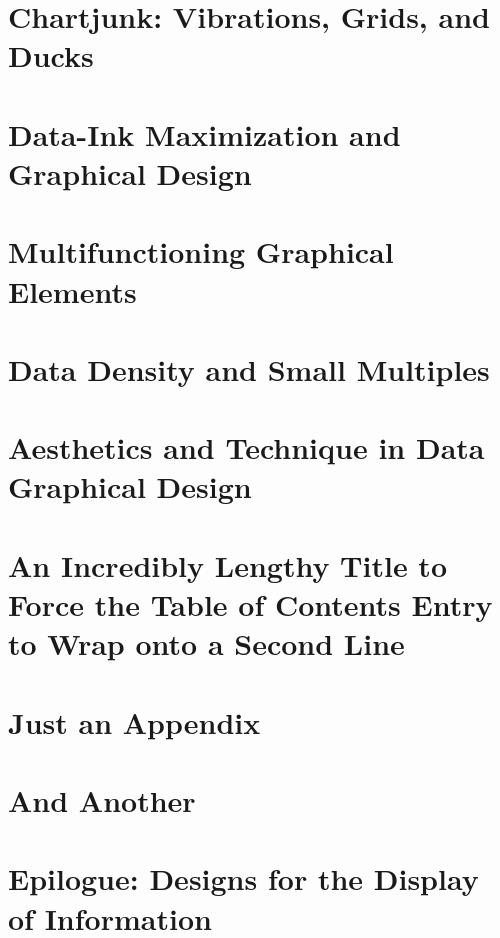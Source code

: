 \documentclass{bayeshyp}
\begin{document}
\chapter{Chartjunk: Vibrations, Grids, and Ducks}
\setcounter{page}{107}

\chapter{Data-Ink Maximization and Graphical Design}
\setcounter{page}{123}

\chapter{Multifunctioning Graphical Elements}
\setcounter{page}{139}

\chapter{Data Density and Small Multiples}
\setcounter{page}{161}

\chapter{Aesthetics and Technique in Data Graphical Design}
\setcounter{page}{177}

\chapter{An Incredibly Lengthy Title to Force the Table of Contents Entry to Wrap onto a Second Line}
\setcounter{page}{181}

\appendix

\chapter{Just an Appendix}
\setcounter{page}{183}

\chapter{And Another}
\setcounter{page}{185}

\backmatter
\chapter{Epilogue: Designs for the Display of Information}
\setcounter{page}{191}
\end{document}
